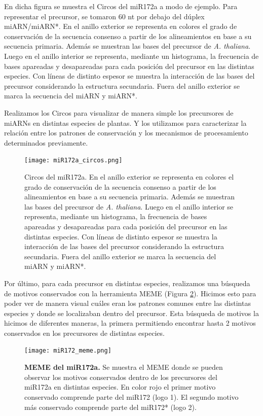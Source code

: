 En dicha figura se muestra el Circos del miR172a a modo de ejemplo.
Para representar el precursor, se tomaron 60 nt por debajo del dúplex miARN/miARN*.
En el anillo exterior se representa en colores el grado de conservación de la secuencia consenso a partir de los alineamientos en base a su secuencia primaria.
Además se muestran las bases del precursor de \textit {A. thaliana}.
Luego en el anillo interior se representa, mediante un histograma, la frecuencia de bases apareadas y desapareadas para cada posición del precursor en las distintas especies.
Con líneas de distinto espesor se muestra la interacción de las bases del precursor considerando la estructura secundaria. 
Fuera del anillo exterior se marca la secuencia del miARN y miARN*.

Realizamos los Circos para visualizar de manera simple los precursores de miARNs en distintas especies de plantas.
Y los utilizamos para caracterizar la relación entre los patrones de conservación y los mecanismos de procesamiento determinados previamente.


\begin{figure}[htbp!] 
    \centering    
    \texttt{[image: miR172a\_circos.png]}
    \caption[Circos del miR172a]{Circos del miR172a.
En el anillo exterior se representa en colores el grado de conservación de la secuencia consenso a partir de los alineamientos en base a su secuencia primaria.
Además se muestran las bases del precursor de \textit {A. thaliana}.
Luego en el anillo interior se representa, mediante un histograma, la frecuencia de bases apareadas y desapareadas para cada posición del precursor en las distintas especies.
Con líneas de distinto espesor se muestra la interacción de las bases del precursor considerando la estructura secundaria. 
Fuera del anillo exterior se marca la secuencia del miARN y miARN*.
   }
     \label{fig:miR172a_circos}
\end{figure}

Por último, para cada precursor en distintas especies, realizamos una búsqueda de motivos conservados con la herramienta MEME \citep{pmid22115189} (Figura \ref{fig:miR172_meme}).
Hicimos esto para poder ver de manera visual cuáles eran los patrones comunes entre las distintas especies y donde se localizaban dentro del precursor.
Esta búsqueda de motivos la hicimos de diferentes maneras, la primera permitiendo encontrar hasta 2 motivos conservados en los precursores de distintas especies.


\begin{landscape}
    \begin{figure}[htbp!] 
        \centering    
        \texttt{[image: miR172\_meme.png]}
        \caption[MEME del miR172a]{
			\textbf{MEME del miR172a.}
        Se muestra el MEME donde se pueden observar los motivos conservados dentro de los precursores del miR172a en distintas especies.
        En color rojo el primer motivo conservado comprende parte del miR172 (logo 1).
        El segundo motivo más conservado comprende parte del miR172* (logo 2).
        }
        \label{fig:miR172_meme}
    \end{figure}
\end{landscape}

